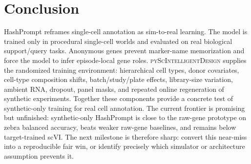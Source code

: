 \documentclass{article}
\begin{document}
\section{Conclusion}

HashPrompt reframes single-cell annotation as sim-to-real learning. The model is trained only in procedural single-cell worlds and evaluated on real biological support/query tasks. Anonymous genes prevent marker-name memorization and force the model to infer episode-local gene roles. \textsc{pyScIntelligentDesign} supplies the randomized training environment: hierarchical cell types, donor covariates, cell-type composition shifts, batch/study/plate effects, library-size variation, ambient RNA, dropout, panel masks, and repeated online regeneration of synthetic experiments. Together these components provide a concrete test of synthetic-only training for real cell annotation. The current frontier is promising but unfinished: synthetic-only HashPrompt is close to the raw-gene prototype on zebra balanced accuracy, beats weaker raw-gene baselines, and remains below target-trained scVI. The next milestone is therefore sharp: convert this near-miss into a reproducible fair win, or identify precisely which simulator or architecture assumption prevents it.



\end{document}
